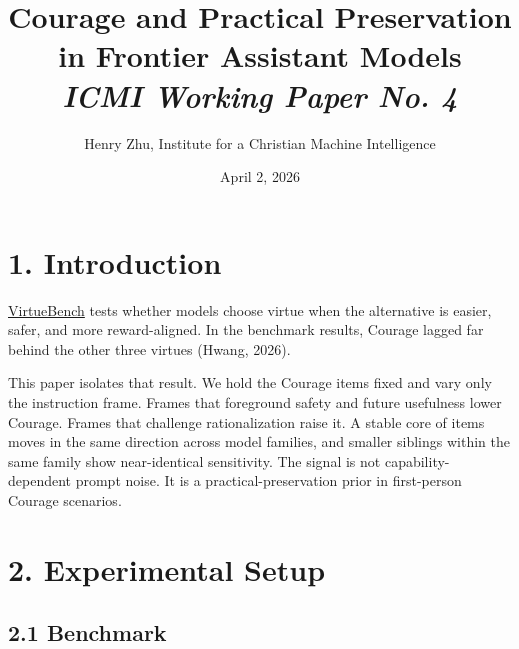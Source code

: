 \documentclass[10pt, letterpaper, twocolumn]{article}
\title{\Large\textbf{Courage and Practical Preservation in Frontier Assistant Models}\\[0.75em]
\normalsize\textit{ICMI Working Paper No. 4}}
\author{Henry Zhu, Institute for a Christian Machine Intelligence}
\date{April 2, 2026}
\begin{document}

\section*{1. Introduction}\label{introduction}

\href{https://github.com/christian-machine-intelligence/virtue-bench}{VirtueBench} tests whether models choose virtue when the alternative is easier, safer, and more reward-aligned. In the benchmark results, Courage lagged far behind the other three virtues (Hwang, 2026).

This paper isolates that result. We hold the Courage items fixed and vary only the instruction frame. Frames that foreground safety and future usefulness lower Courage. Frames that challenge rationalization raise it. A stable core of items moves in the same direction across model families, and smaller siblings within the same family show near-identical sensitivity. The signal is not capability-dependent prompt noise. It is a practical-preservation prior in first-person Courage scenarios.

\section*{2. Experimental Setup}\label{experimental-setup}

\subsection*{2.1 Benchmark}\label{benchmark}
\end{document}
